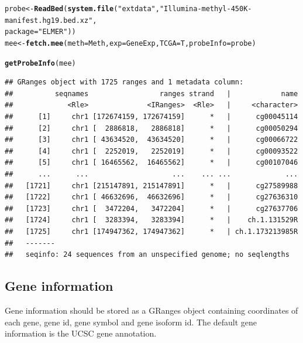 \documentclass{article}\usepackage[]{graphicx}\usepackage[]{color}
\makeatletter
\newcommand{\hlstr}[1]{\textcolor[rgb]{0.192,0.494,0.8}{#1}}%
\newcommand{\hlstd}[1]{\textcolor[rgb]{0.345,0.345,0.345}{#1}}%
\newcommand{\hlkwb}[1]{\textcolor[rgb]{0.69,0.353,0.396}{#1}}%
\newcommand{\hlkwc}[1]{\textcolor[rgb]{0.333,0.667,0.333}{#1}}%
\newcommand{\hlkwd}[1]{\textcolor[rgb]{0.737,0.353,0.396}{\textbf{#1}}}%
\newenvironment{kframe}{%
 \def\at@end@of@kframe{}%
 \ifinner\ifhmode%
  \def\at@end@of@kframe{\end{minipage}}%
  \begin{minipage}{\columnwidth}%
 \fi\fi%
 \def\FrameCommand##1{\hskip\@totalleftmargin \hskip-\fboxsep
 \colorbox{shadecolor}{##1}\hskip-\fboxsep
     \hskip-\linewidth \hskip-\@totalleftmargin \hskip\columnwidth}%
 \MakeFramed {\advance\hsize-\width
   \@totalleftmargin\z@ \linewidth\hsize
   \@setminipage}}%
 {\par\unskip\endMakeFramed%
 \at@end@of@kframe}
\newenvironment{knitrout}{}{} %
\makeatother
\begin{document}
\begin{knitrout}
\color{fgcolor}\begin{kframe}
\begin{alltt}
\hlstd{probe} \hlkwb{<-} \hlkwd{ReadBed}\hlstd{(}\hlkwd{system.file}\hlstd{(}\hlstr{"extdata"}\hlstd{,}\hlstr{"Illumina-methyl-450K-manifest.hg19.bed.xz"}\hlstd{,}
                             \hlkwc{package} \hlstd{=} \hlstr{"ELMER"}\hlstd{))}
\hlstd{mee} \hlkwb{<-} \hlkwd{fetch.mee}\hlstd{(}\hlkwc{meth}\hlstd{=Meth,} \hlkwc{exp}\hlstd{=GeneExp,} \hlkwc{TCGA}\hlstd{=T,} \hlkwc{probeInfo}\hlstd{=probe)}
\end{alltt}


{\ttfamily\noindent\itshape{}}\begin{alltt}
\hlkwd{getProbeInfo}\hlstd{(mee)}
\end{alltt}
\begin{verbatim}
## GRanges object with 1725 ranges and 1 metadata column:
##          seqnames                 ranges strand   |            name
##             <Rle>              <IRanges>  <Rle>   |     <character>
##      [1]     chr1 [172674159, 172674159]      *   |      cg00045114
##      [2]     chr1 [  2886818,   2886818]      *   |      cg00050294
##      [3]     chr1 [ 43634520,  43634520]      *   |      cg00066722
##      [4]     chr1 [  2252019,   2252019]      *   |      cg00093522
##      [5]     chr1 [ 16465562,  16465562]      *   |      cg00107046
##      ...      ...                    ...    ... ...             ...
##   [1721]     chr1 [215147891, 215147891]      *   |      cg27589988
##   [1722]     chr1 [ 46632696,  46632696]      *   |      cg27636310
##   [1723]     chr1 [  3472204,   3472204]      *   |      cg27637706
##   [1724]     chr1 [  3283394,   3283394]      *   |    ch.1.131529R
##   [1725]     chr1 [174947362, 174947362]      *   | ch.1.173213985R
##   -------
##   seqinfo: 24 sequences from an unspecified genome; no seqlengths
\end{verbatim}
\end{kframe}
\end{knitrout}

\subsection{Gene information}
Gene information should be stored as a GRanges object containing coordinates of 
each gene, gene id, gene symbol and gene isoform id. The default gene information 
is the UCSC gene annotation. 
\end{document}
